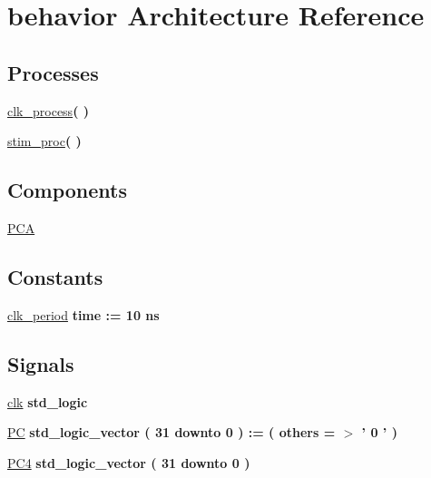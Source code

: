 \hypertarget{class_p_c_adder__tb_1_1behavior}{\section{behavior \-Architecture \-Reference}
\label{class_p_c_adder__tb_1_1behavior}
}
\*
\*
\subsection*{\-Processes}
 \begin{DoxyCompactItemize}
\item 
\hyperlink{class_p_c_adder__tb_1_1behavior_ac5bb218131b813f7908ec89476b31fca}{clk\-\_\-process}{\bfseries  (  )}
\item 
\hyperlink{class_p_c_adder__tb_1_1behavior_ad2efa6785cff833c341e27596b21aeb5}{stim\-\_\-proc}{\bfseries  (  )}
\end{DoxyCompactItemize}
\subsection*{\-Components}
 \begin{DoxyCompactItemize}
\item 
\hyperlink{class_p_c_adder__tb_1_1behavior_a5dc0e950c743b6867902097030b977b0}{\-P\-C\-A}  {\bfseries }  
\end{DoxyCompactItemize}
\subsection*{\-Constants}
 \begin{DoxyCompactItemize}
\item 
\hyperlink{class_p_c_adder__tb_1_1behavior_ab3c46918aa1e58060e340ba6e16733a9}{clk\-\_\-period} {\bfseries time  \-:=  10  ns } 
\end{DoxyCompactItemize}
\subsection*{\-Signals}
 \begin{DoxyCompactItemize}
\item 
\hyperlink{class_p_c_adder__tb_1_1behavior_ad58a2240944eedcee02839cbcf3f871b}{clk} {\bfseries std\-\_\-logic } 
\item 
\hyperlink{class_p_c_adder__tb_1_1behavior_a41945ec3325c2b38b7618dd164dbc2ef}{\-P\-C} {\bfseries std\-\_\-logic\-\_\-vector (   31    downto    0  )  \-:= (  others  = $>$ '  0  '  ) } 
\item 
\hyperlink{class_p_c_adder__tb_1_1behavior_a6e9bc854a8af2389b8d808375c044d2f}{\-P\-C4} {\bfseries std\-\_\-logic\-\_\-vector (   31    downto    0  ) } 
\end{DoxyCompactItemize}


